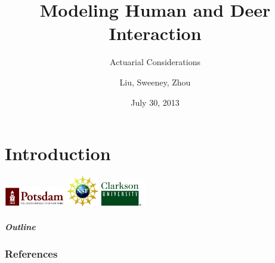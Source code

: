 \documentclass{beamer}   %
\begin{document}
\part{Introduction}


\title{Modeling Human and Deer Interaction}
\subtitle{Actuarial Considerations}

\author{Liu, Sweeney, Zhou}
\date{July 30, 2013}

\begin{frame}[plain]
  \titlepage
  \begin{center}
  \includegraphics[width=0.2\textwidth]{SUNYPotsdam}
  \includegraphics[width=0.1\textwidth]{nsf_logobig}
  \includegraphics[width=0.15\textwidth]{clarksonGreen}
\end{center}
\end{frame}

\begin{frame}
  \frametitle{Outline}
  \vspace{-5mm}
  \tableofcontents[]
\end{frame}











\section{References}
\end{document}
